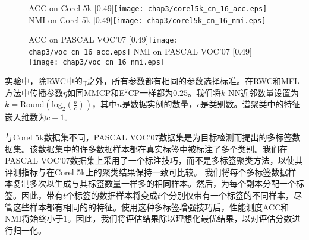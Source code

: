 \begin{figure}[t]
	\centering
					{ACC on  Corel 5k}
					[0.49\textwidth]{\texttt{[image: chap3/corel5k\_cn\_16\_acc.eps]}}
                    \label{fig3:corel5k_cn_16_acc}
					{NMI on  Corel 5k}
                    [0.49\textwidth]{\texttt{[image: chap3/corel5k\_cn\_16\_nmi.eps]}}
                    \label{fig3:corel5k_cn_16_nmi}
                    
	\centering
					{ACC on  PASCAL VOC'07}
					[0.49\textwidth]{\texttt{[image: chap3/voc\_cn\_16\_acc.eps]}}
                    \label{fig3:voc_cn_16_acc}
					{NMI on  PASCAL VOC'07}
					[0.49\textwidth]{\texttt{[image: chap3/voc\_cn\_16\_nmi.eps]}}
                    \label{fig3:voc_cn_16_nmi}
	\label{fig3:cn_16}
\end{figure} 

实验中，除RWC中的$\gamma $之外，所有参数都有相同的参数选择标准。在RWC和MFL方法中传播参数$ \eta $如同MMCP和E$^2$CP一样都为$ 0.25 $。我们将$k$-NN近邻数量设置为$ k = \mathrm{Round}(\mathrm{log}_2(\frac{n}{c}))$，其中$ n $是数据实例的数量，$ c $是类别数。谱聚类中的特征嵌入维数为$ c + 1 $。

与Corel 5k数据集不同，PASCAL VOC'07数据集是为目标检测而提出的多标签数据集。该数据集中的许多数据样本都在真实标签中被标注了多个类别。我们在PASCAL VOC'07数据集上采用了一个标注技巧，而不是多标签聚类方法，以使其评测指标与在Corel 5k上的聚类结果保持一致可比较。
我们将每个多标签数据样本复制多次以生成与其标签数量一样多的相同样本。然后，为每个副本分配一个标签。因此，带有$ t $个标签的数据样本将变成$ t $个分别仅带有一个标签的不同样本，尽管这些样本都有相同的的特征。使用这种多标签增强技巧后，性能测度ACC和NMI将始终小于1。因此，我们将评估结果除以理想化最优结果，以对评估分数进行归一化。

